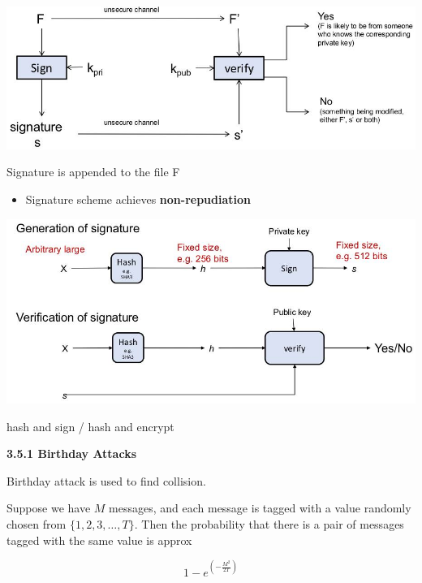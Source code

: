 \documentclass[landscape,a4paper]{extarticle}
\newenvironment{Figure}
  {\par\noindent\minipage{\linewidth}}
  {\endminipage\par\medskip}
\begin{document}
\begin{multicols*}{5}
    \begin{Figure}
        \centering
        \includegraphics[width=\linewidth]{signature.jpg}
    \end{Figure}
    Signature is appended to the file F
    \begin{itemize}
        \item Signature scheme achieves \textbf{non-repudiation}
    \end{itemize}
    \begin{Figure}
        \centering
        \includegraphics[width=\linewidth]{signature_generation_verification.jpg}
    \end{Figure}
    hash and sign / hash and encrypt

    \textbf{3.5.1 Birthday Attacks}

    Birthday attack is used to find collision. 

    Suppose we have $M$ messages, and each message is tagged with a value randomly chosen from $\{1,2,3, \ldots, T\}$.
    Then the probability that there is a pair of messages tagged with the same value is approx

    \begin{equation*}
        1-e^{\left(-\frac{M^2}{2T}\right)}
    \end{equation*}

\end{multicols*}
\end{document}
